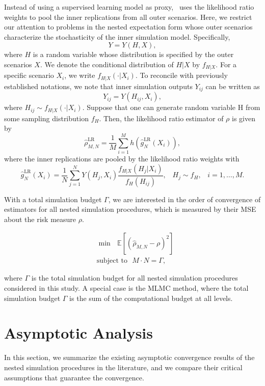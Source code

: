 Instead of using a supervised learning model as proxy,~\cite{zhang2022sample} uses the likelihood ratio weights to pool the inner replications from all outer scenarios.
Here, we restrict our attention to problems in the nested expectation form whose outer scenarios characterize the stochasticity of the inner simulation model. 
Specifically,
$$ Y = Y(H, X), $$
where $H$ is a random variable whose distribution is specified by the outer scenarios $X$. 
We denote the conditional distribution of $H|X$ by $f_{H|X}$. 
For a specific scenario $X_i$, we write $f_{H|X}(\cdot |X_i)$. 
To reconcile with previously established notations, we note that inner simulation outputs $Y_{ij}$ can be written as
$$ Y_{ij} = Y(H_{ij}, X_i), $$
where $H_{ij} \sim f_{H|X}(\cdot |X_i)$.
Suppose that one can generate random variable H from some sampling
distribution $f_H$. Then, the likelihood ratio estimator of $\rho$ is given by
$$\hat{\rho}^{\text{LR}}_{M,N} = \frac{1}{M} \sum_{i=1}^M h(\hat{g}^{\text{LR}}_N(X_i)), $$ where the inner replications are pooled by the likelihood ratio weights with
$$\hat{g}^{\text{LR}}_N(X_i) = \frac{1}{N} \sum_{j=1}^N Y(H_j, X_i) \frac{f_{H|X}(H_{j}|X_i)}{f_H(H_{ij})}, \;\;\; H_j \sim f_H, \;\;\; i=1, \dots, M.$$

With a total simulation budget $\Gamma$, we are interested in the order of convergence of estimators for all nested simulation procedures, which is measured by their MSE about the risk measure $\rho$.

\begin{align}
    & \min ~~~ \mathbb{E} \left[ \left( \hat{\rho}_{M, N} - \rho \right)^2 \right] \nonumber \\
    & \text{subject to} ~~~ M \cdot N = \Gamma, 
\end{align}

where $\Gamma$ is the total simulation budget for all nested simulation procedures considered in this study.
A special case is the MLMC method, where the total simulation budget $\Gamma$ is the sum of the computational budget at all levels.

\section{Asymptotic Analysis} \label{sec1:asymptotic-convergence}
In this section, we summarize the existing asymptotic convergence results of the nested simulation procedures in the literature, and we compare their critical assumptions that guarantee the convergence.

